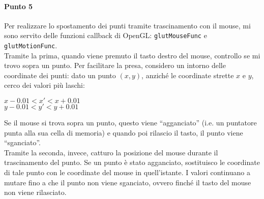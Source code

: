 \documentclass[a4paper, 12pt]{article}
\begin{document}
\paragraph{Punto 5}
Per realizzare lo spostamento dei punti tramite trascinamento con il mouse, mi sono servito delle funzioni callback di OpenGL: \texttt{glutMouseFunc} e \texttt{glutMotionFunc}.\\
Tramite la prima, quando viene premuto il tasto destro del mouse, controllo se mi trovo sopra un punto. Per facilitare la presa, considero un intorno delle coordinate dei punti: dato un punto $(x,y)$, anziché le coordinate strette $x$ e $y$, cerco dei valori più laschi:
\begin{center}
	$x-0.01 < x' < x+0.01$ \\
$y-0.01 < y' < y+0.01$
\end{center}
Se il mouse si trova sopra un punto, questo viene ``agganciato'' (i.e. un puntatore punta alla sua cella di memoria) e quando poi rilascio il tasto, il punto viene ``sganciato''.\\
Tramite la seconda, invece, catturo la posizione del mouse durante il trascinamento del punto. Se un punto è stato agganciato, sostituisco le coordinate di tale punto con le coordinate del mouse in quell'istante. I valori continuano a mutare fino a che il punto non viene sganciato, ovvero finché il tasto del mouse non viene rilasciato.


\end{document}
